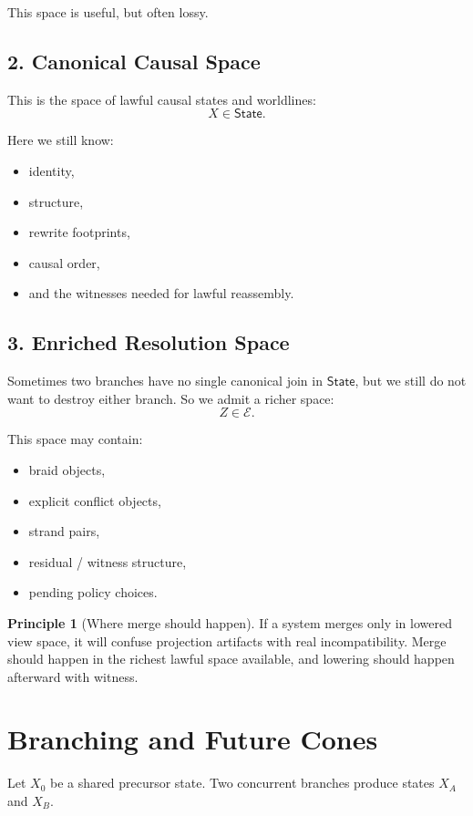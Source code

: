 \documentclass[11pt]{article}
\newcommand{\State}{\ensuremath{\mathsf{State}}}
\newcommand{\Enriched}{\ensuremath{\mathcal{E}}}
\theoremstyle{definition}
\newtheorem{principle}{Principle}
\begin{document}
This space is useful, but often lossy.

\subsection{2. Canonical Causal Space}

This is the space of lawful causal states and worldlines:
\[
X \in \State.
\]

Here we still know:
\begin{itemize}[leftmargin=2em]
\item identity,
\item structure,
\item rewrite footprints,
\item causal order,
\item and the witnesses needed for lawful reassembly.
\end{itemize}

\subsection{3. Enriched Resolution Space}

Sometimes two branches have no single canonical join in $\State$, but we still
do not want to destroy either branch. So we admit a richer space:
\[
Z \in \Enriched.
\]

This space may contain:
\begin{itemize}[leftmargin=2em]
\item braid objects,
\item explicit conflict objects,
\item strand pairs,
\item residual / witness structure,
\item pending policy choices.
\end{itemize}

\begin{principle}[Where merge should happen]
If a system merges only in lowered view space, it will confuse projection
artifacts with real incompatibility. Merge should happen in the richest lawful
space available, and lowering should happen afterward with witness.
\end{principle}

\section{Branching and Future Cones}

Let $X_0$ be a shared precursor state. Two concurrent branches produce states
$X_A$ and $X_B$.
\end{document}
